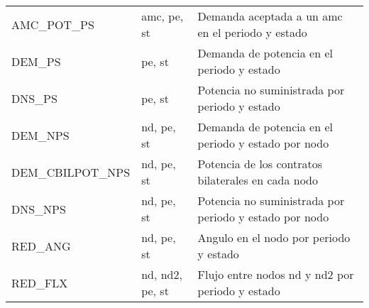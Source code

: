 \documentclass[11pt]{article}
\begin{document}
\begin{tabular}{|l|l|l|}
AMC\_POT\_PS & amc, pe, st & Demanda aceptada a un amc en el periodo y estado \\ 
DEM\_PS & pe, st & Demanda de potencia en el periodo y estado \\ 
DNS\_PS & pe, st & Potencia no suministrada por periodo y estado \\ 
DEM\_NPS & nd, pe, st & Demanda de potencia en el periodo y estado por nodo \\ 
DEM\_CBILPOT\_NPS & nd, pe, st & Potencia de los contratos bilaterales en cada nodo \\ 
DNS\_NPS & nd, pe, st & Potencia no suministrada por periodo y estado por nodo \\ 
RED\_ANG & nd, pe, st & Angulo en el nodo por periodo y estado \\ 
RED\_FLX & nd, nd2, pe, st & Flujo entre nodos nd y nd2 por periodo y estado \\ 
\hline 
\end{tabular}
\end{document}
